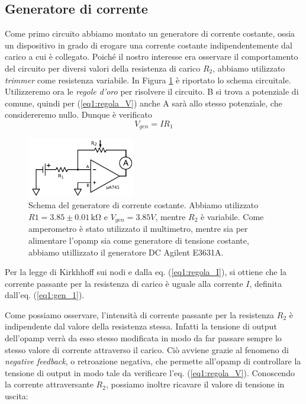 \subsection{Generatore di corrente}

Come primo circuito abbiamo montato un generatore di corrente costante, ossia un dispositivo in grado di erogare una corrente costante indipendentemente dal carico a cui è collegato.
Poiché il nostro interesse era osservare il comportamento del circuito per diversi valori della resistenza di carico $R_2$, abbiamo utilizzato \textit{trimmer} come resistenza variabile. In Figura \ref{cir1:gen_continua} è riportato lo schema circuitale.
Utilizzeremo ora le \textit{regole d'oro} per risolvere il circuito. B si trova a potenziale di comune, quindi per (\ref{eq1:regola_V}) anche A sarà allo stesso potenziale, che considereremo nullo. Dunque è verificato
\begin{equation}
V_{gen}=I R_1
\label{eq1:gen_1}
\end{equation}

\begin{figure}
  \caption{Schema del generatore di corrente costante. Abbiamo utilizzato $R1=3.85 \pm 0.01 \,\si{\kilo\ohm}$ e $V_{gen}=3.85 V$, mentre $R_2$ è variabile. Come amperometro è stato utilizzato il multimetro, mentre sia per alimentare l'opamp sia come generatore di tensione costante, abbiamo utillizzato il generatore DC Agilent E3631A.}
  \begin{center}
    \includegraphics[width=0.42\textwidth]{../E01/latex/c1.pdf}
  \end{center}
\label{cir1:gen_continua}
\end{figure}

Per la legge di Kirkhhoff sui nodi e dalla eq. (\ref{eq1:regola_I}), si ottiene che la corrente passante per la resistenza di carico è uguale alla corrente $I$, definita dall'eq. (\ref{eq1:gen_1}).

Come possiamo osservare, l'intensità di corrente passante per la resistenza $R_2$ è indipendente dal valore della resistenza stessa. Infatti la tensione di output dell'opamp verrà da esso stesso modificata in modo da far passare sempre lo stesso valore di corrente attraverso il carico.
Ciò avviene grazie al fenomeno di \textit{negative feedback}, o retroazione negativa, che permette all'opamp di controllare la tensione di output in modo tale da verificare l'eq. (\ref{eq1:regola_V}).
Conoscendo la corrente attraversante $R_2$, possiamo inoltre ricavare il valore di tensione in uscita:

